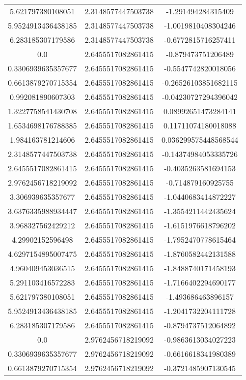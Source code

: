 \begin{table}
\begin{tabular}{ccc}
5.621797380108051 & 2.3148577447503738 & -1.291494284315409 \\
5.9524913436438185 & 2.3148577447503738 & -1.0019810408304246 \\
6.283185307179586 & 2.3148577447503738 & -0.6772815716257411 \\
0.0 & 2.6455517082861415 & -0.879473751206489 \\
0.3306939635357677 & 2.6455517082861415 & -0.5547742820018056 \\
0.6613879270715354 & 2.6455517082861415 & -0.26526103851682115 \\
0.992081890607303 & 2.6455517082861415 & -0.04230727294396042 \\
1.3227758541430708 & 2.6455517082861415 & 0.08992651473284141 \\
1.6534698176788385 & 2.6455517082861415 & 0.11711074180018088 \\
1.984163781214606 & 2.6455517082861415 & 0.036299575448568544 \\
2.3148577447503738 & 2.6455517082861415 & -0.14374984053335726 \\
2.6455517082861415 & 2.6455517082861415 & -0.4035263581694153 \\
2.9762456718219092 & 2.6455517082861415 & -0.714879160925755 \\
3.306939635357677 & 2.6455517082861415 & -1.0440683414872227 \\
3.6376335988934447 & 2.6455517082861415 & -1.3554211442435624 \\
3.968327562429212 & 2.6455517082861415 & -1.6151976618796202 \\
4.29902152596498 & 2.6455517082861415 & -1.7952470778615464 \\
4.6297154895007475 & 2.6455517082861415 & -1.8760582442131588 \\
4.960409453036515 & 2.6455517082861415 & -1.8488740171458193 \\
5.291103416572283 & 2.6455517082861415 & -1.7166402294690177 \\
5.621797380108051 & 2.6455517082861415 & -1.493686463896157 \\
5.9524913436438185 & 2.6455517082861415 & -1.2041732204111728 \\
6.283185307179586 & 2.6455517082861415 & -0.8794737512064892 \\
0.0 & 2.9762456718219092 & -0.9863613034027223 \\
0.3306939635357677 & 2.9762456718219092 & -0.6616618341980389 \\
0.6613879270715354 & 2.9762456718219092 & -0.3721485907130545 \\

\end{tabular}
\end{table}
